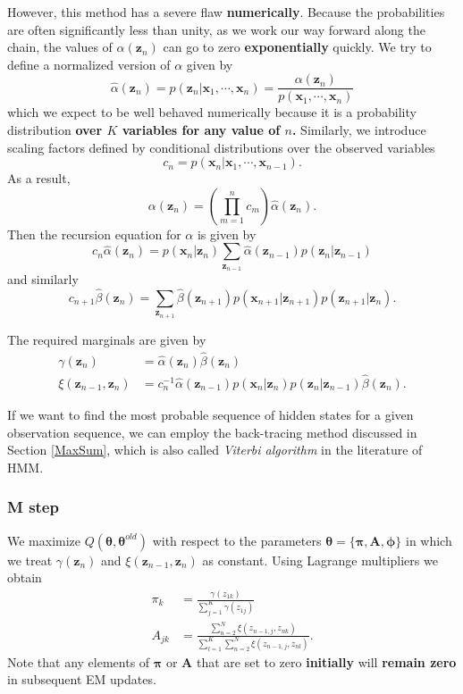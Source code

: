 \documentclass[a4paper]{book}
\renewcommand{\bf}{\mathbf}
\newcommand{\imp}[1]{\textit{#1}}
\newcommand{\bs}{\boldsymbol}
\begin{document}
However, this method has a severe flaw \textbf{numerically}. Because the probabilities are often significantly less than unity, as we work our way forward along the chain, the values of $\alpha(\bf{z}_n)$ can go to zero \textbf{exponentially} quickly. We try to define a normalized version of $\alpha$ given by
\begin{equation}
	\hat{\alpha}(\bf{z}_n) = p(\bf{z}_n|\bf{x}_1,\cdots,\bf{x}_n)=\frac{\alpha(\bf{z}_n)}{p(\bf{x}_1,\cdots,\bf{x}_n)}
\end{equation}
which we expect to be well behaved numerically because it is a probability distribution \textbf{over $K$ variables for any value of $n$.} Similarly, we introduce scaling factors defined by conditional distributions over the observed variables
\begin{equation}
	c_n = p(\bf{x}_n|\bf{x}_1,\cdots,\bf{x}_{n-1}).
\end{equation}
As a result,
\begin{equation}
	\alpha(\bf{z}_n) = \left( \prod_{m=1}^n c_m \right) \hat{\alpha}(\bf{z}_n).
\end{equation}
Then the recursion equation for $\alpha$ is given by
\begin{equation}
	c_n \hat{\alpha}(\bf{z}_n) = p(\bf{x}_n|\bf{z}_n)\sum_{\bf{z}_{n-1}} \hat{\alpha}(\bf{z}_{n-1})p(\bf{z}_n|\bf{z}_{n-1})
\end{equation}
and similarly
\begin{equation}
	c_{n+1}\hat{\beta}(\bf{z}_n) = \sum_{\bf{z}_{n+1}} \hat{\beta}(\bf{z}_{n+1})p(\bf{x}_{n+1}|\bf{z}_{n+1})p(\bf{z}_{n+1}|\bf{z}_n).
\end{equation}

The required marginals are given by
\begin{align}
	\gamma(\bf{z}_n) &= \hat{\alpha}(\bf{z}_n) \hat{\beta}(\bf{z}_n) \\
	\xi(\bf{z}_{n-1},\bf{z}_n) &= c_n^{-1} \hat{\alpha}(\bf{z}_{n-1})p(\bf{x}_n|\bf{z}_n)p(\bf{z}_n|\bf{z}_{n-1})\hat{\beta}(\bf{z}_n).
\end{align}

If we want to find the most probable sequence of hidden states for a given observation sequence, we can employ the back-tracing method discussed in Section \ref{MaxSum}, which is also called \imp{Viterbi algorithm} in the literature of HMM.

\subsubsection{M step}
We maximize $Q(\bs{\theta},\bs{\theta}^{old})$ with respect to the parameters $\bs{\theta}=\{\bs{\pi},\bf{A},\bs{\phi} \}$ in which we treat $\gamma(\bf{z}_n)$ and $\xi(\bf{z}_{n-1},\bf{z}_n)$ as constant. Using Lagrange multipliers we obtain
\begin{align}
	\pi_k &= \frac{\gamma(z_{1k})}{\sum_{j=1}^K \gamma(z_{1j})} \\
	A_{jk} &= \frac{\sum_{n=2}^N \xi(z_{n-1,j},z_{nk})}{\sum_{l=1}^K\sum_{n=2}^N \xi(z_{n-1,j},z_{nl})}.
\end{align}
Note that any elements of $\bs{\pi}$ or $\bf{A}$ that are set to zero \textbf{initially} will \textbf{remain zero} in subsequent EM updates.
\end{document}
